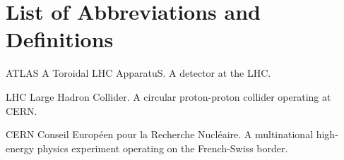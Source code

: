 \chapter*{List of Abbreviations and Definitions}

\begin{symbollist*}
\item[ATLAS] A Toroidal LHC ApparatuS. A detector at the LHC.
\item[LHC] Large Hadron Collider. A circular proton-proton collider operating at CERN.
\item[CERN] Conseil Européen pour la Recherche Nucléaire. A multinational high-energy physics experiment operating on the French-Swiss border.
\end{symbollist*}